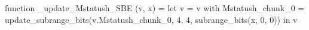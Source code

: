 function _update_Mstatush_SBE (v, x) = let v = { v with Mstatush_chunk_0 = update_subrange_bits(v.Mstatush_chunk_0, 4, 4, subrange_bits(x, 0, 0)) } in
  v
